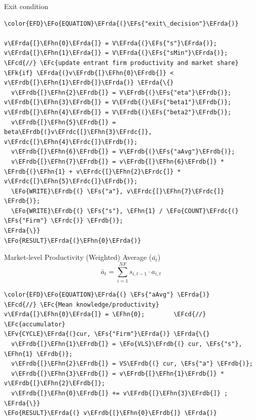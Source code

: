 \documentclass[bigger,aspectratio=169]{beamer}
\newcommand{\EFc}[1]{\textcolor{EFc}{#1}} %
\newcommand{\EFcd}[1]{\textcolor{EFcd}{#1}} %
\newcommand{\EFs}[1]{\textcolor{EFs}{#1}} %
\newcommand{\EFk}[1]{\textcolor{EFk}{#1}} %
\newcommand{\EFv}[1]{\textcolor{EFv}{#1}} %
\newcommand{\EFo}[1]{\textcolor{EFo}{#1}} %
\newcommand{\EFhn}[1]{\textcolor{EFhn}{\textbf{#1}}} %
\newcommand{\EFrda}[1]{\textcolor{EFrda}{#1}} %
\newcommand{\EFrdb}[1]{\textcolor{EFrdb}{#1}} %
\newcommand{\EFrdc}[1]{\textcolor{EFrdc}{#1}} %
\begin{document}
\begin{frame}[label={sec:org70d384f},fragile]{Exit condition}
 \begin{Code}
\begin{Verbatim}
\color{EFD}\EFo{EQUATION}\EFrda{(}\EFs{"exit\_decision"}\EFrda{)}

v\EFrda{[}\EFhn{0}\EFrda{]} = V\EFrda{(}\EFs{"s"}\EFrda{)}; v\EFrda{[}\EFhn{1}\EFrda{]} = V\EFrda{(}\EFs{"sMin"}\EFrda{)};
\EFcd{//} \EFc{update entrant firm productivity and market share}
\EFk{if} \EFrda{(}v\EFrdb{[}\EFhn{0}\EFrdb{]} < v\EFrdb{[}\EFhn{1}\EFrdb{]}\EFrda{)} \EFrda{\{}
  v\EFrdb{[}\EFhn{2}\EFrdb{]} = V\EFrdb{(}\EFs{"eta"}\EFrdb{)}; v\EFrdb{[}\EFhn{3}\EFrdb{]} = V\EFrdb{(}\EFs{"beta1"}\EFrdb{)}; v\EFrdb{[}\EFhn{4}\EFrdb{]} = V\EFrdb{(}\EFs{"beta2"}\EFrdb{)};
  v\EFrdb{[}\EFhn{5}\EFrdb{]} = beta\EFrdb{(}v\EFrdc{[}\EFhn{3}\EFrdc{]}, v\EFrdc{[}\EFhn{4}\EFrdc{]}\EFrdb{)};
  v\EFrdb{[}\EFhn{6}\EFrdb{]} = V\EFrdb{(}\EFs{"aAvg"}\EFrdb{)};
  v\EFrdb{[}\EFhn{7}\EFrdb{]} = v\EFrdb{[}\EFhn{6}\EFrdb{]} * \EFrdb{(}\EFhn{1} + v\EFrdc{[}\EFhn{2}\EFrdc{]} * v\EFrdc{[}\EFhn{5}\EFrdc{]}\EFrdb{)};
  \EFo{WRITE}\EFrdb{(} \EFs{"a"}, v\EFrdc{[}\EFhn{7}\EFrdc{]} \EFrdb{)};
  \EFo{WRITE}\EFrdb{(} \EFs{"s"}, \EFhn{1} / \EFo{COUNT}\EFrdc{(} \EFs{"Firm"} \EFrdc{)} \EFrdb{)};
\EFrda{\}}
\EFo{RESULT}\EFrda{(}\EFhn{0}\EFrda{)}
\end{Verbatim}
\end{Code}
\end{frame}
\begin{frame}[label={sec:org6eee494},fragile]{Market-level Productivity (Weighted) Average (\(\bar{a_{t}}\))}
 \begin{equation}
\bar{a}_{t} =  \sum_{i=1}^{NF} s_{i, t-1}\cdot a_{i,t}
\end{equation}


\begin{Code}
\begin{Verbatim}
\color{EFD}\EFo{EQUATION}\EFrda{(} \EFs{"aAvg"} \EFrda{)}
\EFcd{//} \EFc{Mean knowledge/productivity}
v\EFrda{[}\EFhn{0}\EFrda{]} = \EFhn{0};        \EFcd{//} \EFc{accumulator}
\EFv{CYCLE}\EFrda{(}cur, \EFs{"Firm"}\EFrda{)} \EFrda{\{}
  v\EFrdb{[}\EFhn{1}\EFrdb{]} = \EFo{VLS}\EFrdb{(} cur, \EFs{"s"}, \EFhn{1} \EFrdb{)};
  v\EFrdb{[}\EFhn{2}\EFrdb{]} = VS\EFrdb{(} cur, \EFs{"a"} \EFrdb{)};
  v\EFrdb{[}\EFhn{3}\EFrdb{]} = v\EFrdb{[}\EFhn{1}\EFrdb{]} * v\EFrdb{[}\EFhn{2}\EFrdb{]};
  v\EFrdb{[}\EFhn{0}\EFrdb{]} += v\EFrdb{[}\EFhn{3}\EFrdb{]} ;
\EFrda{\}}
\EFo{RESULT}\EFrda{(} v\EFrdb{[}\EFhn{0}\EFrdb{]} \EFrda{)}
\end{Verbatim}
\end{Code}
\end{frame}
\end{document}
